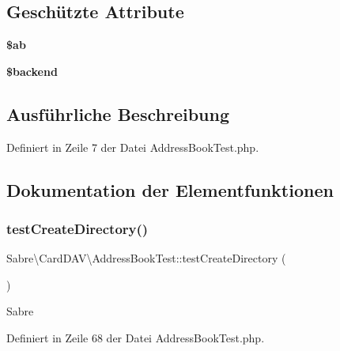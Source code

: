 \subsection*{Geschützte Attribute}
\begin{DoxyCompactItemize}
\item 
\mbox{\label{class_sabre_1_1_card_d_a_v_1_1_address_book_test_a6354a950bc92ef31d973cf066bae5d0c}} 
{\bfseries \$ab}
\item 
\mbox{\label{class_sabre_1_1_card_d_a_v_1_1_address_book_test_a3bc529d9b2c4fc6090ca88822e577e46}} 
{\bfseries \$backend}
\end{DoxyCompactItemize}


\subsection{Ausführliche Beschreibung}


Definiert in Zeile 7 der Datei Address\+Book\+Test.\+php.



\subsection{Dokumentation der Elementfunktionen}
\mbox{\label{class_sabre_1_1_card_d_a_v_1_1_address_book_test_a06ad4bd0dc81328737dd1e81c26d95d5}} 
\subsubsection{\texorpdfstring{test\+Create\+Directory()}{testCreateDirectory()}}
{\footnotesize\ttfamily Sabre\textbackslash{}\+Card\+D\+A\+V\textbackslash{}\+Address\+Book\+Test\+::test\+Create\+Directory (\begin{DoxyParamCaption}{ }\end{DoxyParamCaption})}

Sabre 

Definiert in Zeile 68 der Datei Address\+Book\+Test.\+php.

